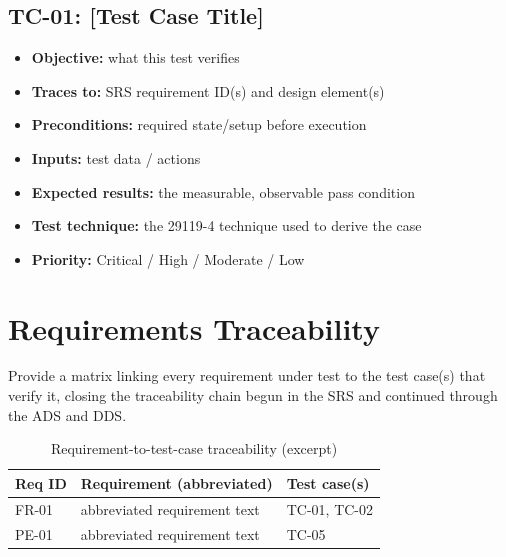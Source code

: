 \documentclass[11pt,letterpaper]{article}
\begin{document}
\subsection{TC-01: [Test Case Title]}
\begin{itemize}
  \item \textbf{Objective:} what this test verifies
  \item \textbf{Traces to:} SRS requirement ID(s) and design element(s)
  \item \textbf{Preconditions:} required state/setup before execution
  \item \textbf{Inputs:} test data / actions
  \item \textbf{Expected results:} the measurable, observable pass condition
  \item \textbf{Test technique:} the 29119-4 technique used to derive the case
  \item \textbf{Priority:} Critical / High / Moderate / Low
\end{itemize}

\section{Requirements Traceability}
Provide a matrix linking every requirement under test to the test case(s) that verify it, closing the traceability chain begun in the SRS and continued through the ADS and DDS.

\begin{table}[H]
\caption{Requirement-to-test-case traceability (excerpt)}
\begin{center}
    \begin{tabular}{ | p{2.5cm} | p{6cm} | p{3cm} |}
    \hline
    \textbf{Req ID} & \textbf{Requirement (abbreviated)} & \textbf{Test case(s)} \\ \hline
    FR-01 & abbreviated requirement text & TC-01, TC-02 \\ \hline
    PE-01 & abbreviated requirement text & TC-05 \\ \hline
    \end{tabular}
\end{center}
\end{table}


{}
\end{document}
